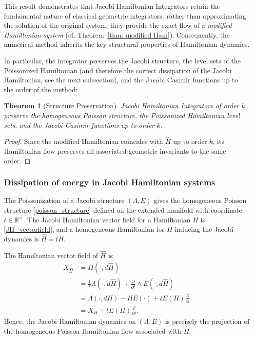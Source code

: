 \documentclass[12pt,english]{article}
\newtheorem{thm}{Theorem}[section]
\begin{document}
This result demonstrates that Jacobi Hamiltonian Integrators retain the fundamental nature of classical geometric integrators: rather than approximating the solution of the original system, they provide the exact flow of a \emph{modified Hamiltonian system} (cf. Theorem~\ref{thm: modified Ham}). Consequently, the numerical method inherits the key structural properties of Hamiltonian dynamics.

In particular, the integrator preserves the Jacobi structure, the level sets of the Poissonized Hamiltonian (and therefore the correct dissipation of the Jacobi Hamiltonian, see the next subsection), and the Jacobi Casimir functions up to the order of the method:

\begin{thm}[Structure Preservation]
Jacobi Hamiltonian Integrators of order $k$ preserve the homogeneous Poisson structure, the Poissonized Hamiltonian level sets, and the Jacobi Casimir functions up to order $k$.
\end{thm}

\begin{proof}
Since the modified Hamiltonian coincides with $\hat H$ up to order $k$, its Hamiltonian flow preserves all associated geometric invariants to the same order.
\end{proof}

\subsubsection{Dissipation of energy in Jacobi Hamiltonian systems}

The Poissonization of a Jacobi structure $(\Lambda,E)$ gives the homogeneous Poisson structure \eqref{poisson_structure} defined on the extended manifold with coordinate $t\in\mathbb{R}^\times$. The Jacobi Hamiltonian vector field for a Hamiltonian $H$ is \eqref{JH_vectorfield}, and a homogeneous Hamiltonian for $\Pi$ inducing the Jacobi dynamics is $\hat H = tH$.

The Hamiltonian vector field of $\hat H$ is
\begin{align*}
X_{\hat H} 
&= \Pi(\cdot,d\hat H) \\
&= \frac{1}{t}\Lambda(\cdot,d\hat H) + \frac{\partial}{\partial t}\wedge E(\cdot,d\hat H) \\
&= \Lambda(\cdot,dH) - H E(\cdot) + tE(H)\frac{\partial}{\partial t} \\
&= X_H + tE(H)\frac{\partial}{\partial t}.
\end{align*}
Hence, the Jacobi Hamiltonian dynamics on $(\Lambda,E)$ is precisely the projection of the homogeneous Poisson Hamiltonian flow associated with $\hat H$. 
\end{document}

